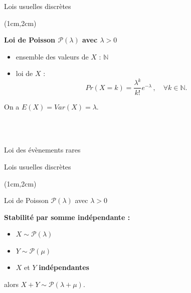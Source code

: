 \documentclass{beamer}
\begin{document}









\begin{frame}{Lois usuelles discrètes}
\begin{textblock*}{\textwidth}(1cm,2cm)
\begin{center}{\bf \Large Loi de Poisson $\mathcal{P}(\lambda)$ avec $\lambda>0$ }\end{center}

\begin{itemize}
 \item ensemble des valeurs de $X$ : $\mathbb{N}$ 
 \item   loi de $X$ :
$$
Pr(X=k)=\frac{\lambda^k}{k !} e^{-\lambda} \,, \quad \forall k\in\mathbb{N}.
$$
\end{itemize}

 
\noindent On a $E(X)=Var(X)=\lambda$.\\

\

\


Loi des évènements rares
 \end{textblock*}
\end{frame}






\begin{frame}{Lois usuelles discrètes}
\begin{textblock*}{\textwidth}(1cm,2cm)
\begin{center}{Loi de Poisson $\mathcal{P}(\lambda)$ avec $\lambda>0$ }\end{center}

{\bf Stabilité par somme indépendante :}

\begin{itemize}
\item $X\sim \mathcal{P}(\lambda)$
\item $Y\sim \mathcal{P}(\mu)$ 
\item $X$ et $Y$ {\bf indépendantes}
\end{itemize}

alors  $X+Y\sim\mathcal{P}(\lambda+\mu)$.

 \end{textblock*}
\end{frame}
\end{document}
